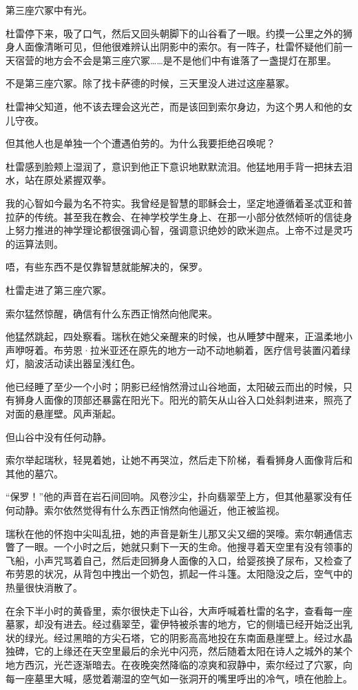 \documentclass[AutoFakeBold=true]{book}
\begin{document}
第三座穴冢中有光。

杜雷停下来，吸了口气，然后又回头朝脚下的山谷看了一眼。约摸一公里之外的狮身人面像清晰可见，但他很难辨认出阴影中的索尔。有一阵子，杜雷怀疑他们前一天宿营的地方会不会是{\kaishu 第三座}穴冢……是不是他们中有谁落了一盏提灯在那里。

不是第三座穴冢。除了找卡萨德的时候，三天里没人进过这座墓冢。

杜雷神父知道，他不该去理会这光芒，而是该回到索尔身边，为这个男人和他的女儿守夜。

{\kaishu 但其他人也是单独一个个遭遇伯劳的。为什么我要拒绝召唤呢？}

杜雷感到脸颊上湿润了，意识到他正下意识地默默流泪。他猛地用手背一把抹去泪水，站在原处紧握双拳。

{\kaishu 我的心智如今最为名不符实。我曾经是智慧的耶稣会士，坚定地遵循着圣忒亚和普拉萨的传统。甚至我在教会、在神学校学生身上、在那一小部分依然倾听的信徒身上努力推进的神学理论都很强调心智，强调意识绝妙的欧米迦点。上帝不过是灵巧的运算法则。}

{\kaishu 唔，有些东西不是仅靠智慧就能解决的，保罗。}

杜雷走进了第三座穴冢。

\vspace*{1em}

索尔猛然惊醒，确信有什么东西正悄然向他爬来。

他猛然跳起，四处察看。瑞秋在她父亲醒来的时候，也从睡梦中醒来，正温柔地小声咿呀着。布劳恩·拉米亚还在原先的地方一动不动地躺着，医疗信号装置闪着绿灯，脑波活动读出器呈浅红色。

他已经睡了至少一个小时；阴影已经悄然滑过山谷地面，太阳破云而出的时候，只有狮身人面像的顶部还暴露在阳光下。阳光的箭矢从山谷入口处斜刺进来，照亮了对面的悬崖壁。风声渐起。

但山谷中没有任何动静。

索尔举起瑞秋，轻晃着她，让她不再哭泣，然后走下阶梯，看看狮身人面像背后和其他的墓穴。

``保罗！''他的声音在岩石间回响。风卷沙尘，扑向翡翠茔上方，但其他墓冢没有任何动静。索尔依然觉得有什么东西正悄然向他逼近，他正被监视。

瑞秋在他的怀抱中尖叫乱扭，她的声音是新生儿那又尖又细的哭嚎。索尔朝通信志瞥了一眼。一个小时之后，她就只剩下一天的生命。他搜寻着天空里有没有领事的飞船，小声咒骂着自己，然后走回狮身人面像的入口，给婴孩换了尿布，又检查了布劳恩的状况，从背包中拽出一个奶包，抓起一件斗篷。太阳隐没之后，空气中的热量很快消散了。

在余下半小时的黄昏里，索尔很快走下山谷，大声呼喊着杜雷的名字，查看每一座墓冢，却没有进去。经过翡翠茔，霍伊特被杀害的地方，它的侧墙已经开始泛出乳状的绿光。经过黑暗的方尖石塔，它的阴影高高地投在东南面悬崖壁上。经过水晶独碑，它的上缘还在天空里最后的余光中闪亮，然后随着太阳在诗人之城外的某个地方西沉，光芒逐渐暗去。在夜晚突然降临的凉爽和寂静中，索尔经过了穴冢，向每一座墓里大喊，感觉着潮湿的空气如一张洞开的嘴里呼出的冷气，喷在他脸上。
\end{document}
